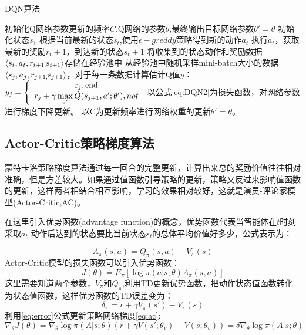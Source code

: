 \begin{algorithm}
	\caption{DQN算法}
	\label{algo:DQN}
	\begin{algorithmic}[1] %
		\State 初始化Q网络参数更新的频率$C$,Q网络的参数$\theta$,最终输出目标网络参数$\theta ' = \theta $
		\State 初始化状态$ {s_1}$
		\State 根据当前最新的状态$ {s_t}$,使用$\epsilon - greddy$策略得到新的动作$a_t $
		\State 执行$a_t $，获取最新的奖励$ r_t+1 $，到达新的状态$ {s_t+1}$
		\State 将收集到的状态动作和奖励数据$ \left\langle {{s_t},{a_t},{r_{t + 1,}}{{\rm{s}}_{t + 1}}} \right\rangle $存储在经验池中
		\State 从经验池中随机采样mini-batch大小的数据$ \left\langle {{s_j},{a_j},{r_{j + 1,}}{{\rm{s}}_{j + 1}}} \right\rangle $，对于每一条数据计算估计Q值$y$：$ {y_j} = \left\{ {\begin{array}{*{20}{c}}
			{{{\rm{r}}_j}{\rm{,end}}}\\
			{{r_j} + \gamma \mathop {\max }\limits_{a'} \hat Q({s_{j + 1}},a';\theta '),not}
			\end{array}} \right.$
		\State 以公式\ref{eq:DQN2}为损失函数，对网络参数进行梯度下降更新。
		\State 以C为更新频率进行网络权重的更新$\theta ' = \theta $。
		\EndFor
		\EndFor
	\end{algorithmic}
\end{algorithm}
\subsection{Actor-Critic策略梯度算法}
蒙特卡洛策略梯度算法通过每一回合的完整更新，计算出来总的奖励价值往往相对准确，但是方差较大。如果通过值函数引导策略的更新，策略又反过来影响值函数的更新，这样两者相结合相互影响，学习的效果相对较好，这就是演员-评论家模型(Actor-Critic,AC)。

在这里引入优势函数(advantage function)的概念，优势函数代表当智能体在$t$时刻采取$a_t$ 动作后达到的状态要比当前状态$s_t$的总体平均价值好多少，公式表示为：

\begin{equation}
{A_\pi }(s,a) = {Q_\pi }(s,a) - {V_\pi }(s)
\end{equation}
Actor-Critic模型的损失函数可以引入优势函数：
\begin{equation}
\label{eq:ac}
J(\theta ) = {E_\pi }[\log \pi (a|s;\theta ){A_\pi }(s,a)]
\end{equation}
这里需要知道两个参数，${V_\pi } $和$ {Q_\pi } $,利用TD更新优势函数，把动作状态值函数转化为状态值函数，这样优势函数的TD误差变为：
\begin{equation}
\label{eq:error}
{\delta _\pi } = r + \gamma {V_\pi }(s') - {V_\pi }(s)
\end{equation}
利用\ref{eq:error}公式更新策略网络梯度\ref{eq:ac}:
\begin{equation}
\label{eq:error}
{\nabla _\theta }J(\theta ) = {\nabla _\theta }\log \pi (A|s;\theta )(r + \gamma V(s';{\theta _v}) - V(s;{\theta _v})) = \delta {\nabla _\theta }\log \pi (A|s;\theta )
\end{equation}

